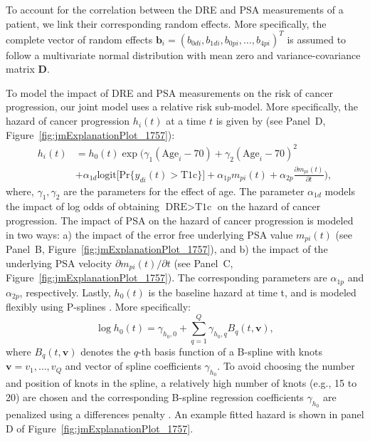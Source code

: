 To account for the correlation between the DRE and PSA measurements of a patient, we link their corresponding random effects. More specifically, the complete vector of random effects ${\boldsymbol{b}_i = (b_{0di}, b_{1di}, b_{0pi}, \ldots, b_{4pi})^T}$ is assumed to follow a multivariate normal distribution with mean zero and variance-covariance matrix $\boldsymbol{D}$.

To model the impact of DRE and PSA measurements on the risk of cancer progression, our joint model uses a relative risk sub-model. More specifically, the hazard of cancer progression $h_i(t)$ at a time $t$ is given by (see Panel~D, Figure~\ref{fig:jmExplanationPlot_1757}):
\begin{equation}
\label{eq:rel_risk_model}
\begin{split}
    h_i(t) &= h_0(t) \exp\Big(\gamma_1 (\mbox{Age}_i-70) + \gamma_2 (\mbox{Age}_i-70)^2\\
    &+\alpha_{1d} \mbox{logit} \big[\mbox{Pr}\{y_{di}(t) > \mbox{T1c}\}\big]+ \alpha_{1p} m_{pi}(t) + \alpha_{2p} \frac{\partial m_{pi}(t)}{\partial {t}}\Big),
    \end{split}
\end{equation}
where, $\gamma_1, \gamma_2$ are the parameters for the effect of age. The parameter $\alpha_{1d}$ models the impact of log odds of obtaining $\mbox{DRE} > \mbox{T1c}$ on the hazard of cancer progression. The impact of PSA on the hazard of cancer progression is modeled in two ways: a) the impact of the error free underlying PSA value $m_{pi}(t)$ (see Panel~B, Figure~\ref{fig:jmExplanationPlot_1757}), and b) the impact of the underlying PSA velocity $\partial m_{pi}(t)/\partial {t}$ (see Panel~C, Figure~\ref{fig:jmExplanationPlot_1757}). The corresponding parameters are $\alpha_{1p}$ and $\alpha_{2p}$, respectively. Lastly, $h_0(t)$ is the baseline hazard at time t, and is modeled flexibly using P-splines \citep{eilers1996flexible}. More specifically:
\begin{equation*}
\log{h_0(t)} = \gamma_{h_0,0} + \sum_{q=1}^Q \gamma_{h_0,q} B_q(t, \boldsymbol{v}),
\end{equation*}
where $B_q(t, \boldsymbol{v})$ denotes the $q$-th basis function of a B-spline with knots $\boldsymbol{v} = v_1, \ldots, v_Q$ and vector of spline coefficients $\gamma_{h_0}$. To avoid choosing the number and position of knots in the spline, a relatively high number of knots (e.g., 15 to 20) are chosen and the corresponding B-spline regression coefficients $\gamma_{h_0}$ are penalized using a differences penalty \citep{eilers1996flexible}. An example fitted hazard is shown in panel D of Figure~\ref{fig:jmExplanationPlot_1757}.  


